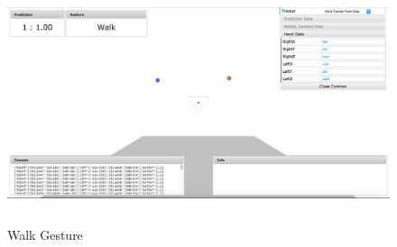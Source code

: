 \begin{figure}
	[h] \centering 
	\includegraphics[height=7cm]{figures/result/cc-walk.jpg} \caption{Walk Gesture} \label{fg:cc:walk} 
\end{figure}
